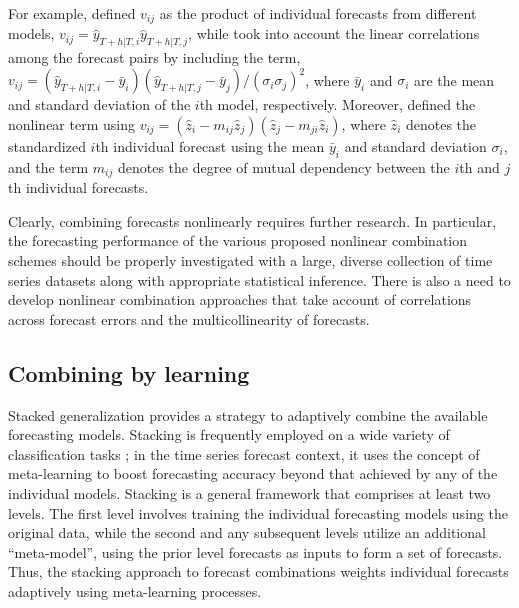 \documentclass[a4paper,11pt]{article}
\begin{document}
For example, \citet{Freitas2006-fn} defined $v_{i j}$ as the product of individual forecasts from different models, $v_{ij} = \hat{y}_{T+h|T, i} \hat{y}_{T+h|T, j}$, while \citet{Adhikari2012-ur} took into account the linear correlations among the forecast pairs by including the term, $v_{ij} = (\hat{y}_{T+h|T, i}-\bar{y}_{i})(\hat{y}_{T+h|T, j}-\bar{y}_{j})/(\sigma_{i}\sigma_{j})^2$, where $\bar{y}_{i}$ and $\sigma_{i}$ are the mean and standard deviation of the $i$th model, respectively. Moreover, \citet{Adhikari2015-bb} defined the nonlinear term using $v_{ij} = \left(\hat{z}_{i}-m_{i j} \hat{z}_{j}\right)\left(\hat{z}_{j}-m_{j i} \hat{z}_{i}\right)$, where $\hat{z}_{i}$ denotes the standardized $i$th individual forecast using the mean $\bar{y}_{i}$ and standard deviation $\sigma_{i}$, and the term $m_{i j}$ denotes the degree of mutual dependency between the $i$th and $j$th individual forecasts.

Clearly, combining forecasts nonlinearly requires further research. In particular, the forecasting performance of the various proposed nonlinear combination schemes should be properly investigated with a large, diverse collection of time series datasets along with appropriate statistical inference. There is also a need to develop nonlinear combination approaches that take account of correlations across forecast errors and the multicollinearity of forecasts.

\subsection{Combining by learning}
\label{sec:comb_learn}

Stacked generalization \citep[stacking,][]{Wolpert1992-if} provides a strategy to adaptively combine the available forecasting models. Stacking is frequently employed on a wide variety of classification tasks \citep{Zhou2012-cy}; in the time series forecast context, it uses the concept of meta-learning to boost forecasting accuracy beyond that achieved by any of the individual models. Stacking is a general framework that comprises at least two levels. The first level involves training the individual forecasting models using the original data, while the second and any subsequent levels utilize an additional ``meta-model'', using the prior level forecasts as inputs to form a set of forecasts. Thus, the stacking approach to forecast combinations  weights individual forecasts adaptively using meta-learning processes.
\end{document}
